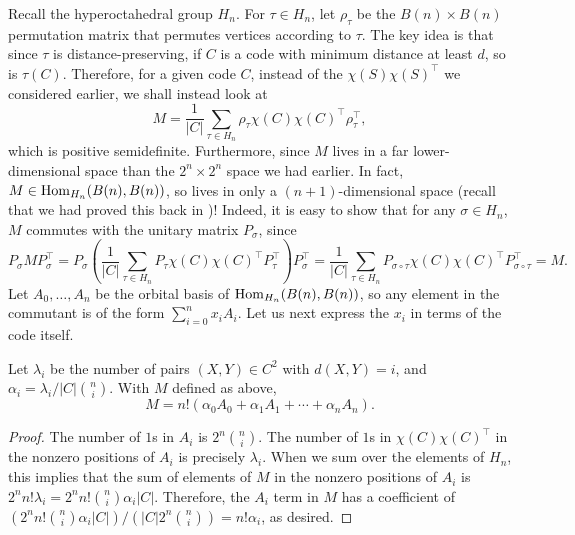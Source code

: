 	Recall the hyperoctahedral group $H_n$. For $\tau \in H_n$, let $\rho_\tau$ be the $B(n) \times B(n)$ permutation matrix that permutes vertices according to $\tau$. The key idea is that since $\tau$ is distance-preserving, if $C$ is a code with minimum distance at least $d$, so is $\tau(C)$. Therefore, for a given code $C$, instead of the $\chi(S) \chi(S)^\top$ we considered earlier, we shall instead look at
	\begin{equation}
		\label{eq:delsarte-key}
		M = \frac{1}{|C|} \sum_{\tau \in H_n} \rho_\tau \chi(C) \chi(C)^\top \rho_\tau^\top,
	\end{equation}
	which is positive semidefinite. Furthermore, since $M$ lives in a far lower-dimensional space than the $2^n \times 2^n$ space we had earlier. In fact, $M \in \operatorname{Hom}_{H_n}(B(n),B(n))$, so lives in only a $(n+1)$-dimensional space (recall that we had proved this back in )! Indeed, it is easy to show that for any $\sigma \in H_n$, $M$ commutes with the unitary matrix $P_\sigma$, since
	\begin{equation}
		\label{eq:1.4}
		P_\sigma M P_\sigma^\top = P_\sigma \left(\frac{1}{|C|} \sum_{\tau \in H_n} P_\tau \chi(C) \chi(C)^\top P_\tau^\top \right) P_\sigma^\top = \frac{1}{|C|} \sum_{\tau \in H_n} P_{\sigma \circ \tau} \chi(C) \chi(C)^\top P_{\sigma \circ \tau}^\top = M.
	\end{equation}
	Let $A_0,\ldots,A_n$ be the orbital basis of $\operatorname{Hom}_{H_n}(B(n),B(n))$, so any element in the commutant is of the form $\sum_{i=0}^n x_i A_i$. Let us next express the $x_i$ in terms of the code itself.

	\begin{fprop}
		\label{prop:delsarte-1}
		Let $\lambda_i$ be the number of pairs $(X,Y) \in C^2$ with $d(X,Y) = i$, and $\alpha_i = \lambda_i / |C| \binom{n}{i}$.  With $M$ defined as above,
		\[ M = n! (\alpha_0 A_0 + \alpha_1 A_1 + \cdots + \alpha_n A_n).  \]
	\end{fprop}
	\begin{proof}
		The number of $1$s in $A_i$ is $2^n \binom{n}{i}$. The number of $1$s in $\chi(C)\chi(C)^\top$ in the nonzero positions of $A_i$ is precisely $\lambda_i$. When we sum over the elements of $H_n$, this implies that the sum of elements of $M$ in the nonzero positions of $A_i$ is $2^n n! \lambda_i = 2^n n! \binom{n}{i} \alpha_i |C|$. Therefore, the $A_i$ term in $M$ has a coefficient of $(2^n n! \binom{n}{i} \alpha_i |C|)/(|C| 2^n \binom{n}{i}) = n! \alpha_i$, as desired.
	\end{proof}

